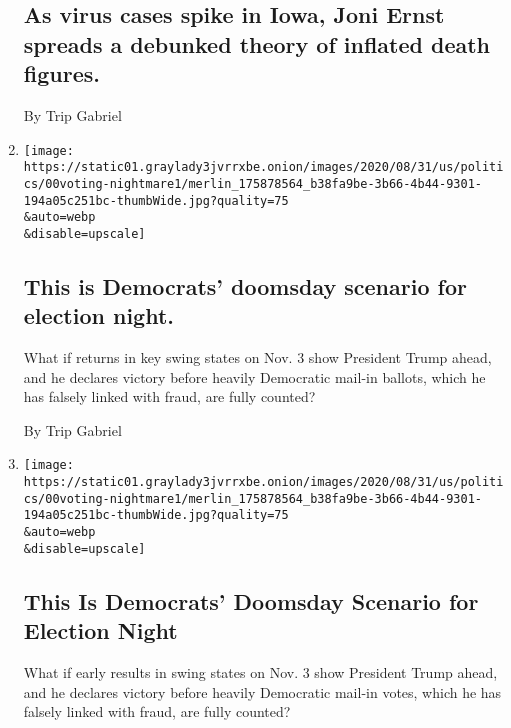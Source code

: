 \begin{enumerate}
  \hypertarget{as-virus-cases-spike-in-iowa-joni-ernst-spreads-a-debunked-theory-of-inflated-death-figures}{%
  \subsection{As virus cases spike in Iowa, Joni Ernst spreads a
  debunked theory of inflated death
  figures.}\label{as-virus-cases-spike-in-iowa-joni-ernst-spreads-a-debunked-theory-of-inflated-death-figures}}

  By Trip Gabriel
\item
  \href{/2020/09/02/us/elections/this-is-democrats-doomsday-scenario-for-election-night.html}{}

  \texttt{[image: https://static01.graylady3jvrrxbe.onion/images/2020/08/31/us/politics/00voting-nightmare1/merlin\_175878564\_b38fa9be-3b66-4b44-9301-194a05c251bc-thumbWide.jpg?quality=75\\\&auto=webp\\\&disable=upscale]}

  \hypertarget{this-is-democrats-doomsday-scenario-for-election-night}{%
  \subsection{This is Democrats' doomsday scenario for election
  night.}\label{this-is-democrats-doomsday-scenario-for-election-night}}

  What if returns in key swing states on Nov. 3 show President Trump
  ahead, and he declares victory before heavily Democratic mail-in
  ballots, which he has falsely linked with fraud, are fully counted?

  By Trip Gabriel
\item
  \href{/2020/09/02/us/politics/voting-election-day.html}{}

  \texttt{[image: https://static01.graylady3jvrrxbe.onion/images/2020/08/31/us/politics/00voting-nightmare1/merlin\_175878564\_b38fa9be-3b66-4b44-9301-194a05c251bc-thumbWide.jpg?quality=75\\\&auto=webp\\\&disable=upscale]}

  \hypertarget{this-is-democrats-doomsday-scenario-for-election-night-1}{%
  \subsection{This Is Democrats' Doomsday Scenario for Election
  Night}\label{this-is-democrats-doomsday-scenario-for-election-night-1}}

  What if early results in swing states on Nov. 3 show President Trump
  ahead, and he declares victory before heavily Democratic mail-in
  votes, which he has falsely linked with fraud, are fully counted?


\end{enumerate}
